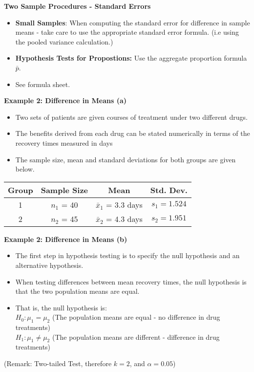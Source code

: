 \noindent \textbf{Two Sample Procedures - Standard Errors}
\begin{itemize}
\item \textbf{Small Samples}: When computing the standard error for difference in sample means - take care to use the appropriate standard error formula. (i.e using the pooled variance calculation.)
\item \textbf{Hypothesis Tests for Propostions:} Use the aggregate proportion formula $\bar{p}$.
\item See formula sheet.
\end{itemize}


\noindent \textbf{Example 2: Difference in Means (a) }
\begin{itemize}
\item Two sets of patients are given courses of treatment under two different drugs. \item 
The benefits
derived from each drug can be stated numerically in terms of the recovery times measured in days
\item The sample size, mean and standard deviations for both groups are given below.
\end{itemize}
\begin{tabular}{|c|c|c|c|}
\hline Group & Sample Size & Mean & Std. Dev.  \\ 
\hline 1 & $n_1$ = 40 & $\bar{x}_1$ = 3.3 days  &  $s_1 = 1.524$ \\ 
\hline 2 & $n_2$ = 45 & $\bar{x}_2$ = 4.3 days & $s_2 = 1.951 $ \\ 
\hline 
\end{tabular} 




\noindent \textbf{Example 2: Difference in Means (b) }
\begin{itemize}
\item
The first step in hypothesis testing is to specify the null hypothesis and an alternative hypothesis.
\item When testing differences between mean recovery times, the null hypothesis is that the two population means are equal.
\item That is, the null hypothesis is:\\
$H_0: \mu_1 = \mu_2$ (The population means are equal - no difference in drug treatments)\\
$H_1: \mu_1 \neq \mu_2$ (The population means are different - difference in drug treatments)\\
\end{itemize}
(Remark: Two-tailed Test, therefore $k = 2$, and $\alpha = 0.05$)


